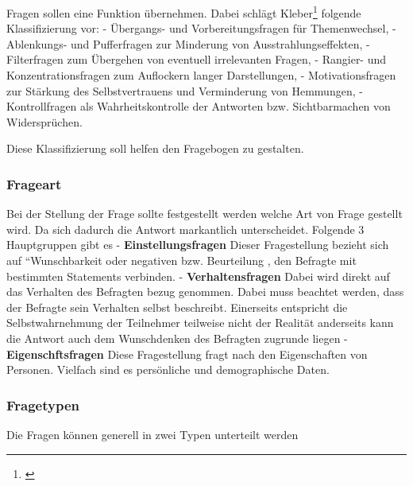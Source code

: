Fragen sollen eine Funktion übernehmen. Dabei schlägt Kleber\footnote{\autocite{kleber92}}
folgende Klassifizierung vor: - Übergangs- und Vorbereitungsfragen für
Themenwechsel, - Ablenkungs- und Pufferfragen zur Minderung von
Ausstrahlungseffekten, - Filterfragen zum Übergehen von eventuell
irrelevanten Fragen, - Rangier- und Konzentrationsfragen zum Auflockern
langer Darstellungen, - Motivationsfragen zur Stärkung des
Selbstvertrauens und Verminderung von Hemmungen, - Kontrollfragen als
Wahrheitskontrolle der Antworten bzw. Sichtbarmachen von Widersprüchen.

Diese Klassifizierung soll helfen den Fragebogen zu gestalten.

\subsubsection{Frageart}\label{frageart}

Bei der Stellung der Frage sollte festgestellt werden welche Art von
Frage gestellt wird. Da sich dadurch die Antwort markantlich
unterscheidet. Folgende 3 Hauptgruppen gibt es -
\textbf{Einstellungsfragen} Dieser Fragestellung bezieht sich auf
``Wunschbarkeit oder negativen bzw. Beurteilung , den Befragte mit
bestimmten Statements verbinden. - \textbf{Verhaltensfragen} Dabei wird
direkt auf das Verhalten des Befragten bezug genommen. Dabei muss
beachtet werden, dass der Befragte sein Verhalten selbst beschreibt.
Einerseits entspricht die Selbstwahrnehmung der Teilnehmer teilweise
nicht der Realität anderseits kann die Antwort auch dem Wunschdenken des
Befragten zugrunde liegen - \textbf{Eigenschftsfragen} Diese
Fragestellung fragt nach den Eigenschaften von Personen. Vielfach sind
es persönliche und demographische Daten.

\subsubsection{Fragetypen}\label{fragetypen}

Die Fragen können generell in zwei Typen unterteilt werden

